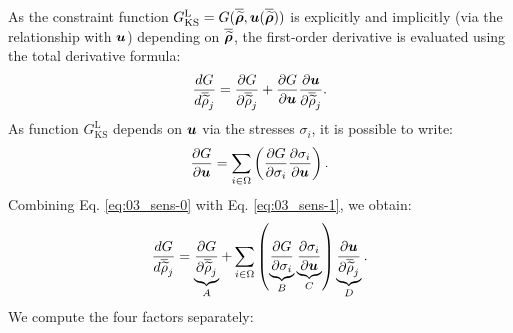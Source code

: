 As the constraint function $G_{\text{KS}}^\text{L} = G(\bm{\overline{\widetilde{\rho}}}, \bm{u}(\bm{\overline{\widetilde{\rho}}}) )$ is explicitly and implicitly (via the relationship with $\bm{u}$) depending on $\bm{\overline{\widetilde{\rho}}}$, the first-order derivative is evaluated using the total derivative formula:
\begin{equation} \label{eq:03_sens-0}
    \frac{d G}{d \overline{\widetilde{\rho}}_j} = \frac{\partial G}{\partial \overline{\widetilde{\rho}}_j} + \frac{\partial G}{\partial\bm{u}} \frac{\partial\bm{u} }{\partial\overline{\widetilde{\rho}}_j}.
\end{equation}
As function $G_{\text{KS}}^\text{L}$ depends on $\bm{u}$ via the stresses $\sigma_i$, it is possible to write:
\begin{equation} \label{eq:03_sens-1}
    \frac{\partial G}{\partial\bm{u}} = \sum_{i \in \Omega} \left( \frac{\partial G}{\partial\sigma_i} \frac{\partial\sigma_i}{\partial\bm{u}}\right).
\end{equation}
Combining Eq. \ref{eq:03_sens-0} with Eq. \ref{eq:03_sens-1}, we obtain:
\begin{equation} \label{eq:03_sens-2}
    \frac{d G}{d \overline{\widetilde{\rho}}_j} = \underbrace{\frac{\partial G}{\partial\overline{\widetilde{\rho}}_j}}_A + \sum_{i \in \Omega} \left( \underbrace{\frac{\partial G}{\partial\sigma_i}}_B \underbrace{\frac{\partial\sigma_i}{\partial\bm{u}}}_C \right)  \underbrace{\frac{\partial\bm{u} }{\partial\overline{\widetilde{\rho}}_j}}_D.
\end{equation}
We compute the four factors separately:
